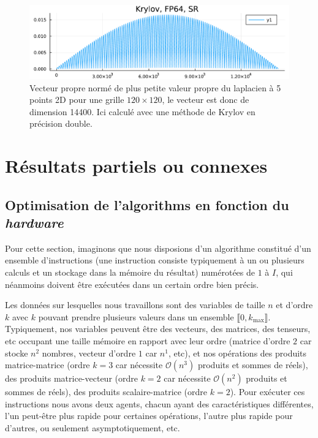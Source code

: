 \documentclass[svgnames,dvipsnames,a4paper,10pt,french]{report}
\begin{document}
\begin{appendices}
\begin{figure}[H]
    \centering
    \includegraphics[width=.8\textwidth]{images/vp_fd_laplacien_2D.pdf}
    \caption{Vecteur propre normé de plus petite valeur propre du laplacien à 5 points 2D pour une grille $120\times 120$, le vecteur est donc de dimension 14400. Ici calculé avec une méthode de Krylov en précision double.}
    \label{fig:vp_laplacien_5pt_2D}
\end{figure}


\chapter{Résultats partiels ou connexes}



\section{Optimisation de l'algorithms en fonction du \textit{hardware}}
\label{sec:optim_hardware}
Pour cette section, imaginons que nous disposions d'un algorithme constitué d'un ensemble d'instructions (une instruction consiste typiquement à un ou plusieurs calculs et un stockage dans la mémoire du résultat) numérotées de $1$ à $I$, qui néanmoins doivent être exécutées dans un certain ordre bien précis.


Les données sur lesquelles nous travaillons sont des variables de taille $n$ et d'ordre $k$ avec $k$ pouvant prendre plusieurs valeurs dans un ensemble $\llbracket 0, k_{\text{max}} \rrbracket$. Typiquement, nos variables peuvent être des vecteurs, des matrices, des tenseurs, etc occupant une taille mémoire en rapport avec leur ordre (matrice d'ordre $2$ car stocke $n^2$ nombres, vecteur d'ordre $1$ car $n^1$, etc), et nos opérations des produits matrice-matrice (ordre $k=3$ car nécessite $ \mathcal{O}(n^3)$ produits et sommes de réels), des produits matrice-vecteur (ordre $k=2$ car nécessite $ \mathcal{O}(n^2)$ produits et sommes de réels), des produits scalaire-matrice (ordre $k=2$). Pour exécuter ces instructions nous avons deux agents, chacun ayant des caractéristiques différentes, l'un peut-être plus rapide pour certaines opérations, l'autre plus rapide pour d'autres, ou seulement asymptotiquement, etc.



\end{appendices}
\end{document}
